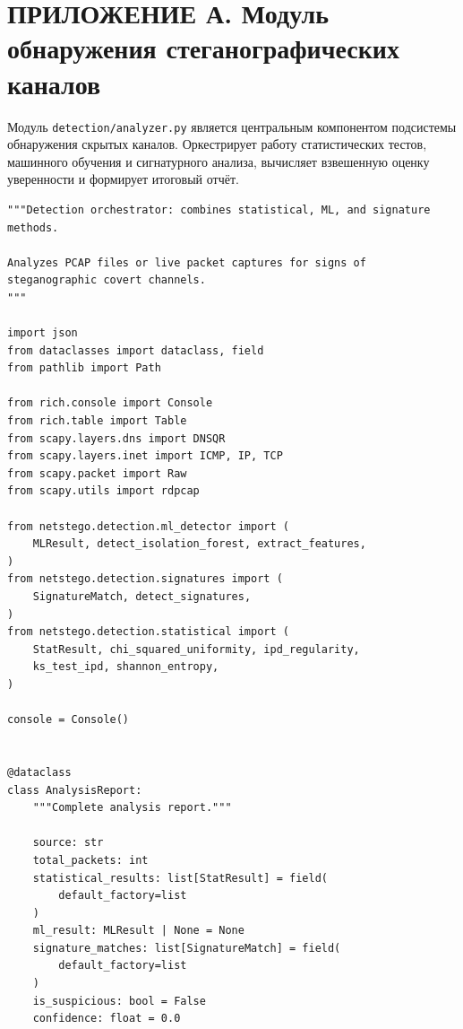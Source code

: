 \newpage
\section*{ПРИЛОЖЕНИЕ А. Модуль обнаружения стеганографических каналов}

Модуль \texttt{detection/analyzer.py} является центральным компонентом
подсистемы обнаружения скрытых каналов. Оркестрирует работу статистических
тестов, машинного обучения и сигнатурного анализа, вычисляет взвешенную
оценку уверенности и формирует итоговый отчёт.

\begin{lstlisting}[style=appendixcode]
"""Detection orchestrator: combines statistical, ML, and signature methods.

Analyzes PCAP files or live packet captures for signs of
steganographic covert channels.
"""

import json
from dataclasses import dataclass, field
from pathlib import Path

from rich.console import Console
from rich.table import Table
from scapy.layers.dns import DNSQR
from scapy.layers.inet import ICMP, IP, TCP
from scapy.packet import Raw
from scapy.utils import rdpcap

from netstego.detection.ml_detector import (
    MLResult, detect_isolation_forest, extract_features,
)
from netstego.detection.signatures import (
    SignatureMatch, detect_signatures,
)
from netstego.detection.statistical import (
    StatResult, chi_squared_uniformity, ipd_regularity,
    ks_test_ipd, shannon_entropy,
)

console = Console()


@dataclass
class AnalysisReport:
    """Complete analysis report."""

    source: str
    total_packets: int
    statistical_results: list[StatResult] = field(
        default_factory=list
    )
    ml_result: MLResult | None = None
    signature_matches: list[SignatureMatch] = field(
        default_factory=list
    )
    is_suspicious: bool = False
    confidence: float = 0.0


\end{lstlisting}
